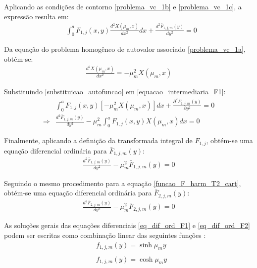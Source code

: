 Aplicando as condições de contorno \eqref{problema_vc_1b} e \eqref{problema_vc_1c}, a expressão resulta em: 
\begin{align}
&
\int_0^a  F_{1,j}(x, y)\frac{d^2X(\mu_m, x)}{dx^2} dx + \frac{d^2 \bar{F}_{1,j,m}(y)}{d y^2} = 0 \label{equacao_intermediaria_F1}
\end{align}

Da equação do problema homogêneo de autovalor associado \eqref{problema_vc_1a}, obtém-se:
\begin{align}
\frac{d^2 X(\mu_m, x)}{d x^2} = -\mu_m^2 X(\mu_m, x) \label{substituicao_autofuncao}
\end{align}

Substituindo \eqref{substituicao_autofuncao} em \eqref{equacao_intermediaria_F1}:
\begin{align}
&
\int_0^a  F_{1,j}(x, y)[-\mu_m^2 X(\mu_m, x)] dx + \frac{\partial^2 \bar{F}_{1,j,m}(y)}{\partial y^2} = 0 \nonumber \\
\Rightarrow &
\frac{d^2 \bar{F}_{1,j,m}(y)}{d y^2}
-
\mu_m^2 \int_0^a  F_{1,j}(x, y)X(\mu_m, x) dx = 0
\end{align}

Finalmente, aplicando a definição da transformada integral de $F_{1, j}$, obtém-se uma equação diferencial ordinária para $\bar{F}_{1,j,m}(y)$:
\begin{align}
\frac{d^2 \bar{F}_{1,j,m}(y)}{d y^2}
-
\mu_m^2 \bar{F}_{1,j,m}(y) = 0 \label{eq_dif_ord_F1}
\end{align}

Seguindo o mesmo procedimento para a equação \eqref{funcao_F_harm_T2_cart}, obtém-se uma equação diferencial ordinária para $\bar{F}_{2,j,m}(y)$:
\begin{align}
\frac{d^2 \bar{F}_{2,j,m}(y)}{d y^2}
-
\mu_m^2 \bar{F}_{2,j,m}(y) = 0 \label{eq_dif_ord_F2}
\end{align}

As soluções gerais das equações diferenciais \eqref{eq_dif_ord_F1} e \eqref{eq_dif_ord_F2} podem ser escritas como combinação linear das seguintes funções \citep{livro_boyce}:
\begin{align}
& f_{1,j,m}(y) = \sinh\mu_m y \label{basic_1}\\ \nonumber \\
& f_{1,j,m}(y) = \cosh\mu_m y \label{basic_2}
\end{align}

